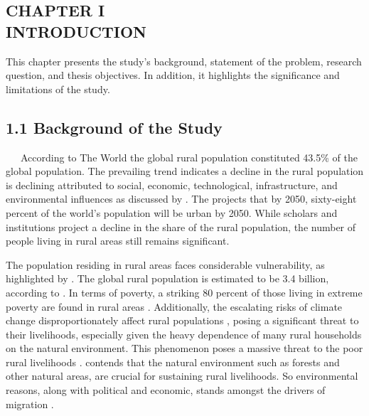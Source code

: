 \documentclass[12pt, a4paper]{article}
\begin{document}
\clearpage %
\begin{center}
\section*{\large{CHAPTER I \\ \vspace{-0.3cm} INTRODUCTION}}
\end{center}
\renewcommand{\thepage}{\arabic{page}} 
\setcounter{page}{1}
This chapter presents the study’s background, statement of the problem,
research question, and thesis objectives. In addition, it highlights the significance
and limitations of the study.\\
\subsection*{1.1 Background of the Study}
\renewcommand{\thepage}{\arabic{page}} 
\ \ \ According to The World \cite{world2018rural} the global rural population constituted 43.5\% 
of the global population. The prevailing trend indicates a decline in the rural population is declining attributed to social, economic, technological, infrastructure, and environmental influences as discussed by \citep{jaszczak2018phenomenon}. The \cite{UNDP} projects that by 2050, sixty-eight percent of the world’s population will be urban by 2050.
While scholars and institutions project a decline in the share of the rural population, the number of people living in rural areas still remains significant.

The population residing in rural areas faces considerable vulnerability, as highlighted by \cite{acharya2008dimension}. The global rural population is estimated to be 3.4 billion, according to \cite{Worldbank2022}. In terms of poverty, a striking 80 percent of those living in extreme poverty are found in rural areas \citep{world2021state}. Additionally, the escalating risks of climate change disproportionately affect rural populations \citep{Researchoverview2022}, posing a significant threat to their livelihoods, especially given the heavy dependence of many rural households on the natural environment. This phenomenon poses a massive threat to the poor rural livelihoods \citep{pelser2022climate}. \cite{angelsen2014environmental} contends that the natural environment such as forests and other natural areas, are crucial for sustaining rural livelihoods. So environmental reasons, along with political and economic, stands amongst the drivers of migration \citep{mcnamara2016insecure}.
\end{document}
